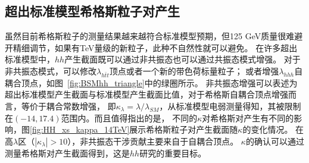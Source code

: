 \subsection{超出标准模型希格斯粒子对产生}
虽然目前希格斯粒子的测量结果越来越符合标准模型预期，但125 GeV质量很难避开精细调节，如果有TeV量级的新粒子，此种不自然性就可以避免。
在许多超出标准模型中，$hh$产生截面既可以通过非共振态也可以通过共振态模式增强。
对于非共振态模式，可以修改$\lambda_{h\bar{t}t}$顶点\cite{Grober:2010yv,Contino:2012xk}或者一个新的带色荷标量粒子\cite{Kribs:2012kz}；
或者增强$\lambda_{hhh}$自耦合顶点，如图~\ref{fig:BSMhh_triangle}中的绿圈所示。
非共振态增强可以表述为超出标准模型产生截面与标准模型产生截面比值，对于希格斯自耦合顶点增强而言，等价于耦合常数增强，
即$\kappa_{\lambda}=\lambda/\lambda_{SM}$，从标准模型电弱测量得知，其被限制在$(-14, 17.4)$\cite{Kribs:2017znd}范围内。而且值得指出的是，
不同的$\kappa$对希格斯对产生有不同的影响\cite{Frederix:2014hta}，图\ref{fig:HH_xs_kappa_14TeV}展示希格斯粒子对产生截面随$\kappa$的变化情况。
在高$\lambda$区（$|\kappa_{\lambda}|>10$），非共振态干涉贡献主要来自于自耦合顶点。
$\kappa$的确认可以通过测量希格斯对产生截面得到，这是$hh$研究的重要目标。
